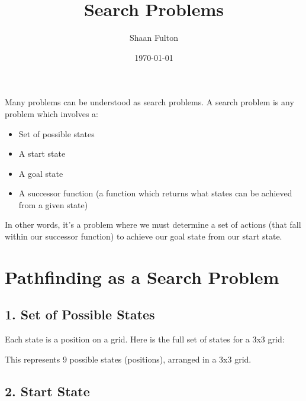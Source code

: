 \documentclass[12pt]{article}
\title{Search Problems}
\author{Shaan Fulton}
\date{\today}
\begin{document}
\maketitle

Many problems can be understood as search problems. A search problem is any problem which involves a:

\begin{itemize}
	\item Set of possible states
	\item A start state
	\item A goal state
	\item A successor function (a function which returns what states can be achieved from a given state)
\end{itemize}

In other words, it's a problem where we must determine a set of actions (that fall within our successor function) to achieve our goal state from our start state.

\section*{Pathfinding as a Search Problem}

\subsection*{1. Set of Possible States}

Each state is a position on a grid. Here is the full set of states for a 3x3 grid:

\begin{center}
\end{center}

This represents 9 possible states (positions), arranged in a 3x3 grid.

\subsection*{2. Start State}

\begin{center}
\end{center}
\end{document}
